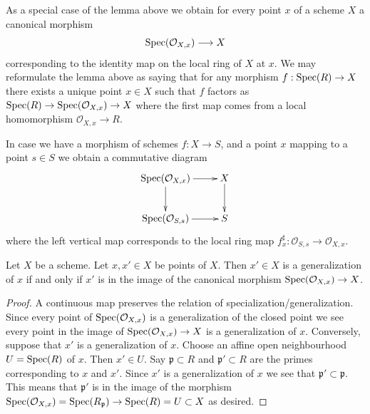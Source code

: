 \noindent
As a special case of the lemma above we obtain for every
point $x$ of a scheme $X$ a canonical morphism
\begin{equation}
\label{equation-canonical-morphism}
\mathop{\mathrm{Spec}}(\mathcal{O}_{X, x}) \longrightarrow X
\end{equation}
corresponding to the identity map on the local ring of $X$ at $x$.
We may reformulate the lemma above as saying that for any
morphism $f : \mathop{\mathrm{Spec}}(R) \to X$ there exists a unique point
$x \in X$ such that $f$ factors as
$\mathop{\mathrm{Spec}}(R) \to \mathop{\mathrm{Spec}}(\mathcal{O}_{X, x}) \to X$
where the first map comes from a local homomorphism
$\mathcal{O}_{X, x} \to R$.

\medskip\noindent
In case we have a morphism of schemes $f : X \to S$,
and a point $x$ mapping to a point $s \in S$ we obtain
a commutative diagram
$$
\xymatrix{
\Spec(\mathcal{O}_{X, x}) \ar[r] \ar[d] & X \ar[d] \\
\Spec(\mathcal{O}_{S, s}) \ar[r] & S
}
$$
where the left vertical map corresponds to the local ring map
$f^\sharp_x : \mathcal{O}_{S, s} \to \mathcal{O}_{X, x}$.

\begin{lemma}
\label{lemma-specialize-points}
Let $X$ be a scheme.
Let $x, x' \in X$ be points of $X$.
Then $x' \in X$ is a generalization of $x$ if and only if
$x'$ is in the image of the canonical morphism
$\mathop{\mathrm{Spec}}(\mathcal{O}_{X, x}) \to X$.
\end{lemma}

\begin{proof}
A continuous map preserves the relation of specialization/generalization.
Since every point of $\mathop{\mathrm{Spec}}(\mathcal{O}_{X, x})$ is a
generalization of the closed point we see every point in the image
of $\mathop{\mathrm{Spec}}(\mathcal{O}_{X, x}) \to X$ is a generalization of $x$.
Conversely, suppose that $x'$ is a generalization of $x$.
Choose an affine open neighbourhood $U = \mathop{\mathrm{Spec}}(R)$ of
$x$. Then $x' \in U$. Say $\mathfrak p \subset R$ and
$\mathfrak p' \subset R$ are the primes corresponding
to $x$ and $x'$. Since $x'$ is a generalization of $x$
we see that $\mathfrak p' \subset \mathfrak p$. This means
that $\mathfrak p'$ is in the image of the morphism
$\mathop{\mathrm{Spec}}(\mathcal{O}_{X, x}) = \mathop{\mathrm{Spec}}(R_{\mathfrak p})
\to \mathop{\mathrm{Spec}}(R) = U \subset X$ as desired.
\end{proof}

